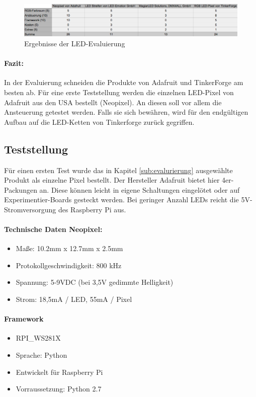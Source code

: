 \begin{figure}[h]
\begin{minipage}{\textwidth}
            \centering
            \includegraphics[width=\textwidth]{./data/evaluierung-led.png}
            \caption{Ergebnisse der LED-Evaluierung}
\end{minipage}
\end{figure}
\paragraph{Fazit:}
In der Evaluierung schneiden die Produkte von Adafruit und TinkerForge am besten ab. Für eine erste Teststellung werden die einzelnen LED-Pixel von Adafruit aus den USA bestellt (Neopixel). An diesen soll vor allem die Ansteuerung getestet werden. Falls sie sich bewähren, wird für den endgültigen Aufbau auf die LED-Ketten von Tinkerforge zurück gegriffen. 

\subsection{Teststellung}
Für einen ersten Test wurde das in Kapitel \ref{sub:evalurierung} ausgewählte Produkt als einzelne Pixel bestellt. Der Hersteller Adafruit bietet hier 4er-Packungen an. Diese können leicht in eigene Schaltungen eingelötet oder auf Experimentier-Boards gesteckt werden. Bei geringer Anzahl LEDs reicht die 5V-Stromversorgung des Raspberry Pi aus. 
\paragraph{Technische Daten Neopixel:} 
	\begin{itemize}
	\item Maße: 10.2mm x 12.7mm x 2.5mm
	\item Protokollgeschwindigkeit: 800 kHz
	\item Spannung: 5-9VDC  (bei 3,5V gedimmte Helligkeit) 
	\item Strom: 18,5mA / LED, 55mA / Pixel
	\end{itemize}
\paragraph{Framework}
	\begin{itemize}
	\item RPI\_WS281X\cite{git-rpi-ws281}
	\item Sprache: Python
	\item Entwickelt für Raspberry Pi
	\item Vorraussetzung: Python 2.7
	\end{itemize}

